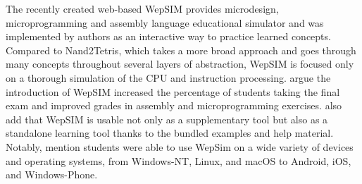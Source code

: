 The recently created web-based WepSIM \parencite{garcia2019wepsim} provides microdesign, microprogramming and assembly language educational simulator and was implemented by authors as an interactive way to practice learned concepts.
Compared to Nand2Tetris, which takes a more broad approach and goes through many concepts throughout several layers of abstraction, WepSIM is focused only on a thorough simulation of the CPU and instruction processing.
\textcite{garcia2019wepsim} argue the introduction of WepSIM increased the percentage of students taking the final exam and improved grades in assembly and microprogramming exercises.
\textcite{garcia2019wepsim} also add that WepSIM is usable not only as a supplementary tool but also as a standalone learning tool thanks to the bundled examples and help material.
Notably, \textcite{garcia2019wepsim} mention students were able to use WepSim on a wide variety of devices and operating systems, from Windows-NT, Linux, and macOS to Android, iOS, and Windows-Phone.
